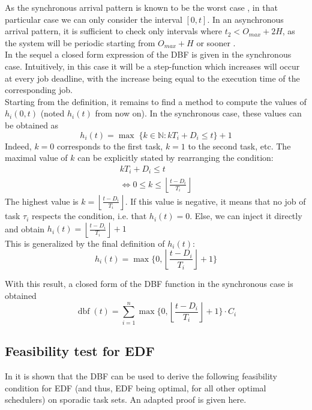 \documentclass[a4paper,10pt]{article}
\newcommand{\dbf}[1]{\operatorname{dbf}(#1)}
\begin{document}
As the synchronous arrival pattern is known to be the worst case
\cite{liu1973scheduling}, in that particular case we can only consider the
interval $[0, t]$. In an asynchronous arrival pattern, it is sufficient to check
only intervals where $t_2 < O_{max} + 2H$, as the system will be
periodic starting from $O_{max} + H$ or sooner \cite{leung1982complexity}.\\

In the sequel a closed form expression of the DBF is given in the synchronous
case. Intuitively, in this case it will be a step-function which increases will
occur at every job deadline, with the increase being equal to the execution time of the corresponding job.\\

Starting from the definition, it remains to find a method to compute the values
of $h_i(0, t)$ (noted $h_i(t)$ from now on). In the synchronous case, these
values can be obtained as
\[
	h_i(t) = \operatorname{max} \; \{ k \in \mathbb{N} :
	k T_i  + D_i \leq t \} + 1
\]
Indeed, $k = 0$ corresponds to the first task, $k = 1$ to the second task, etc.
The maximal value of $k$ can be explicitly stated by rearranging the condition:
\[
	\begin{array}{c}
		k T_i + D_i \leq t \\
		\iff 0 \leq k \leq \left\lfloor \frac{t - D_i}{T_i} \right\rfloor
	\end{array}
\]
The highest value is $k = \left\lfloor \frac{t - D_i}{T_i} \right\rfloor$. If
this value is negative, it means that no job of task $\tau_i$ respects the condition, i.e.
that $h_i(t) = 0$. Else, we can inject it directly and obtain $h_i(t) =
\left\lfloor \frac{t - D_i}{T_i} \right\rfloor + 1$\\

This is generalized by the final definition of $h_i(t)$:
\[
	h_i(t) = \operatorname{max} \{ 0, \left\lfloor \frac{t - D_i}{T_i}
	\right\rfloor + 1\}
\]

With this result, a closed form of the DBF function in the synchronous case is
obtained
\[
	\dbf{t} = \sum_{i=1}^{n} \operatorname{max} \{ 0, \left\lfloor \frac{t -
	D_i}{T_i} \right\rfloor + 1 \} \cdot C_i
\]

\subsection{Feasibility test for EDF}

In \cite{baruah1990algorithms} it is shown that the DBF can be used to
derive the following feasibility condition for EDF (and thus, EDF being
optimal, for all other optimal schedulers) on sporadic task sets. An adapted
proof is given here.
\end{document}
